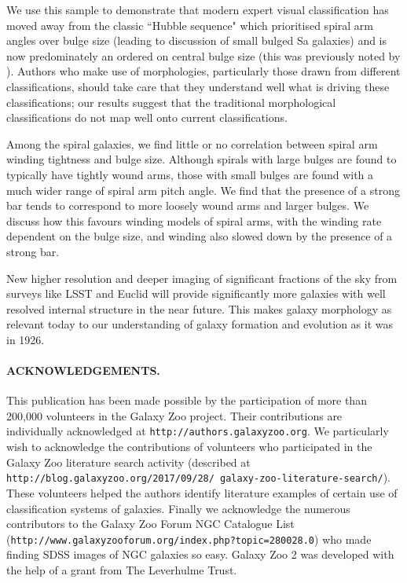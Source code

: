 \documentclass[usenatbib]{mn2e}
\begin{document}
 We use this sample to demonstrate that modern expert visual classification has moved away from the classic ``Hubble sequence" which prioritised spiral arm angles over bulge size (leading to discussion of small bulged Sa galaxies) and is now predominately an ordered on central bulge size (this was previously noted by \citealt{Willett2013}). Authors who make use of morphologies, particularly those drawn from different classifications, should take care that they understand well what is driving these classifications; our results suggest that the traditional morphological classifications do not map well onto current classifications. 
 
Among the spiral galaxies, we find little or no correlation between spiral arm winding tightness and bulge size. Although spirals with large bulges are found to typically have tightly wound  arms, those with small bulges are found with a much wider range of spiral arm pitch angle. We find that the presence of a strong bar tends to correspond to more loosely wound arms and larger bulges. We discuss how this favours winding models of spiral arms, with the winding rate dependent on the bulge size, and winding also slowed down by the presence of a strong bar. 

 New higher resolution and deeper imaging of significant fractions of the sky from surveys like LSST and Euclid will provide significantly more galaxies with well resolved internal structure in the near future. This makes galaxy morphology as relevant today to our understanding of galaxy formation and evolution as it was in 1926. %
  
\paragraph*{ACKNOWLEDGEMENTS.} 

This publication has been made possible by the participation of more than 200,000 volunteers in the Galaxy Zoo project. Their contributions are individually acknowledged at \texttt{http://authors.galaxyzoo.org}.  We particularly wish to acknowledge the contributions of volunteers who participated in the Galaxy Zoo literature search activity (described at {\tt http://blog.galaxyzoo.org/2017/09/28/ galaxy-zoo-literature-search/}). These volunteers helped the authors identify literature examples of certain use of classification systems of galaxies. Finally we acknowledge the numerous contributors to the Galaxy Zoo Forum NGC Catalogue List ({\tt http://www.galaxyzooforum.org/index.php?topic=280028.0}) who made finding SDSS images of NGC galaxies so easy. Galaxy Zoo 2 was developed with the help of a grant from The Leverhulme Trust.
\end{document}
